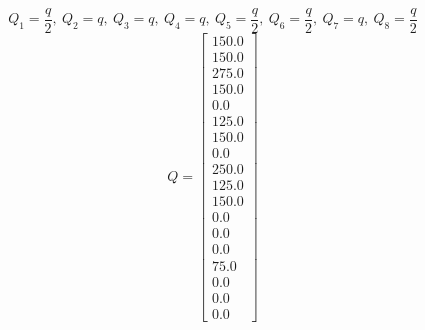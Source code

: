 \documentclass[a4paper, 12pt]{article}
\begin{document}
\[Q_1 = \frac{q}{2},\ Q_2 = q,\ Q_3 = q,\ Q_4 = q,\ Q_5 = \frac{q}{2},\ Q_6 = \frac{q}{2},\ Q_7 = q,\ Q_8 = \frac{q}{2}\]
\[Q = \left[\begin{matrix}150.0\\150.0\\275.0\\150.0\\0.0\\125.0\\150.0\\0.0\\250.0\\125.0\\150.0\\0.0\\0.0\\0.0\\75.0\\0.0\\0.0\\0.0\end{matrix}\right]\]
\end{document}
